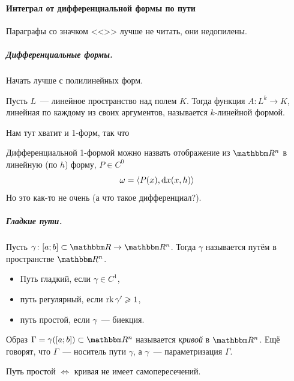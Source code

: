 \documentclass[12pt,timbord]{../../../notes}
\begin{document}
\paragraph{\underdev Интеграл от дифференциальной формы по пути}
\label{par:lineint::defs}
Параграфы со значком  <<\underdev>> лучше не читать, они недопилены.

\subparagraph{Дифференциальные формы.} 
Начать лучше с полилинейных форм.
\begin{defn}\label{defn:lineint::defs::linform}
  Пусть $L$~--- линейное пространство над полем $K$. Тогда функция $A\colon L^k\to K$, линейная по
  каждому из своих аргументов, называется $k$-линейной формой.
\end{defn}


Нам тут хватит и 1-форм, так что
\begin{defn}\label{defn:lineint::defs::diffform}
  Дифференциальной 1-формой можно назвать отображение из $\R^n$ в линейную (по $h$) форму, $P\in C^0$
  \[
    \omega = \langle P(x), \mathrm{d} x(x,h)\rangle
  \]
  Но это как-то не очень ({а что такое дифференциал?}).
\end{defn}

\subparagraph{Гладкие пути.}

\begin{defn}\label{defn:lineint::defs::smoothpath}
  Пусть $\gamma\colon [a;b]\subset \R \to \R^n$. Тогда $\gamma$ называется путём в пространстве
  $\R^n$.
  \begin{itemize}
    \item Путь гладкий, если $\gamma\in C^1$,
    \item путь регулярный, если $\operatorname{rk}\gamma' \geqslant 1$,
    \item путь простой, если $\gamma$~--- биекция.
  \end{itemize}
\end{defn}

\begin{defn}\label{defn:lineint::defs::curve}
  Образ $\Gamma = \gamma([a;b]) \subset \R^n$ называется \emph{кривой} в $\R^n$. Ещё говорят, что
  $\Gamma$~--- носитель пути $\gamma$, а $\gamma$~--- параметризация $\Gamma$. 
\end{defn}

\begin{rem*}
  Путь простой $\Leftrightarrow$ кривая не имеет самопересечений.
\end{rem*}
\end{document}
